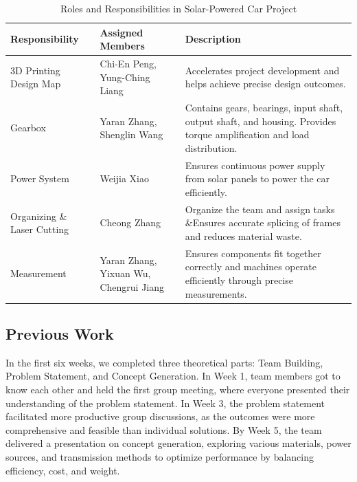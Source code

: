 \documentclass[12pt]{article}
\begin{document}
\begin{table}[h!]
    \centering
    \begin{tabular}{|>{\raggedright\arraybackslash}p{3cm}|>{\raggedright\arraybackslash}p{4.5cm}|>{\raggedright\arraybackslash}p{6cm}|}
        \hline
        \textbf{Responsibility} & \textbf{Assigned Members} & \textbf{Description} \\ 
        \hline
        3D Printing Design Map & Chi-En Peng, Yung-Ching Liang & 
        Accelerates project development and helps achieve precise design outcomes. \\ 
        \hline
        Gearbox & Yaran Zhang, Shenglin Wang & 
        Contains gears, bearings, input shaft, output shaft, and housing. Provides torque amplification and load distribution. \\ 
        \hline
        Power System & Weijia Xiao & 
        Ensures continuous power supply from solar panels to power the car efficiently. \\ 
        \hline
        Organizing  \& Laser Cutting  & Cheong Zhang & 
        Organize the team and assign tasks \&Ensures accurate splicing of frames and reduces material waste. \\ 
        \hline
        Measurement & Yaran Zhang, Yixuan Wu, Chengrui Jiang & 
        Ensures components fit together correctly and machines operate efficiently through precise measurements. \\ 
        \hline
    \end{tabular}
    \caption{Roles and Responsibilities in Solar-Powered Car Project}
\end{table}
\subsection{Previous Work}

In the first six weeks, we completed three theoretical parts: Team Building, Problem Statement, and Concept Generation. In Week 1, team members got to know each other and held the first group meeting, where everyone presented their understanding of the problem statement. In Week 3, the problem statement facilitated more productive group discussions, as the outcomes were more comprehensive and feasible than individual solutions. By Week 5, the team delivered a presentation on concept generation, exploring various materials, power sources, and transmission methods to optimize performance by balancing efficiency, cost, and weight.
\end{document}
